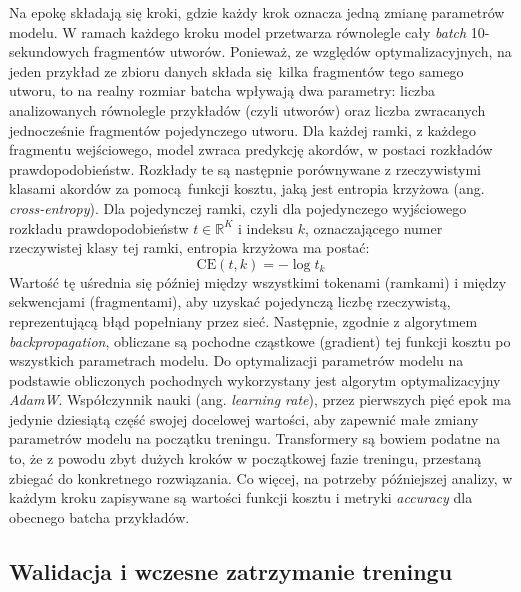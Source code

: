 Na epokę składają się kroki, gdzie każdy krok oznacza jedną zmianę parametrów modelu. W ramach
każdego kroku model przetwarza równolegle cały \emph{batch} 10-sekundowych fragmentów utworów.
Ponieważ, ze względów optymalizacyjnych, na jeden przykład ze zbioru danych składa się kilka
fragmentów tego samego utworu, to na realny rozmiar batcha wpływają dwa parametry: liczba
analizowanych równolegle przykładów (czyli utworów) oraz liczba zwracanych jednocześnie fragmentów
pojedynczego utworu. Dla każdej ramki, z każdego fragmentu wejściowego, model zwraca predykcję akordów, w
postaci rozkładów prawdopodobieństw. Rozkłady te są następnie porównywane z rzeczywistymi klasami
akordów za pomocą funkcji kosztu, jaką jest entropia krzyżowa (ang. \emph{cross-entropy}). Dla
pojedynczej ramki, czyli dla pojedynczego wyjściowego rozkładu prawdopodobieństw $t \in
\mathbb{R}^K$ i indeksu $k$, oznaczającego numer rzeczywistej klasy tej ramki, entropia krzyżowa ma
postać:
\begin{equation}
    \textrm{CE}(t, k) = - \log t_k
\end{equation}
Wartość tę uśrednia się później między wszystkimi tokenami (ramkami) i między sekwencjami
(fragmentami), aby uzyskać pojedynczą liczbę rzeczywistą, reprezentującą błąd popełniany przez sieć.
Następnie, zgodnie z algorytmem \emph{backpropagation}, obliczane są pochodne cząstkowe (gradient)
tej funkcji kosztu po wszystkich parametrach modelu. Do optymalizacji parametrów modelu na podstawie
obliczonych pochodnych wykorzystany jest algorytm optymalizacyjny \emph{AdamW}. Współczynnik nauki
(ang. \emph{learning rate}), przez pierwszych pięć epok ma jedynie dziesiątą część swojej docelowej
wartości, aby zapewnić małe zmiany parametrów modelu na początku treningu. Transformery są bowiem
podatne na to, że z powodu zbyt dużych kroków w początkowej fazie treningu, przestaną zbiegać do
konkretnego rozwiązania. Co więcej, na potrzeby późniejszej analizy, w każdym kroku zapisywane są
wartości funkcji kosztu i metryki \emph{accuracy} dla obecnego batcha przykładów.

\subsection{Walidacja i wczesne zatrzymanie treningu}

